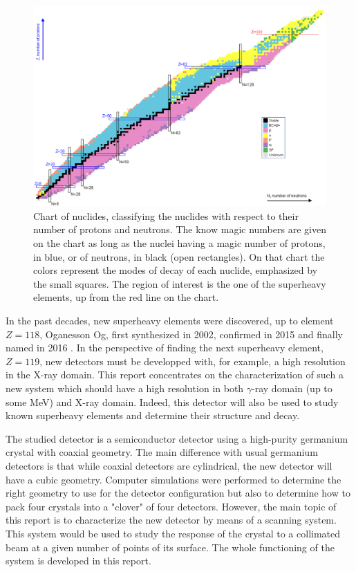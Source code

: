 \documentclass[11pt,a4paper]{article}
\begin{document}
\begin{figure}[!h]
\centering
\includegraphics[scale=0.6]{Nuclchart2.png}
\caption{Chart of nuclides, classifying the nuclides with respect to their number of protons and neutrons. The know magic numbers are given on the chart as long as the nuclei having a magic number of protons, in blue, or of neutrons, in black (open rectangles). On that chart the colors represent the modes of decay of each nuclide, emphasized by the small squares. The region of interest is the one of the superheavy elements, up from the red line on the chart.}
\label{Nuclchart}
\end{figure}

In the past decades, new superheavy elements were discovered, up to element $Z = 118$, Oganesson Og, first synthesized in 2002, confirmed in 2015 and finally named in 2016 \cite{element118}.
In the perspective of finding the next superheavy element, $Z = 119$, new detectors must be developped with, for example, a high resolution in the X-ray domain. This report concentrates on the characterization of such a new system which should have a high resolution in both $\gamma$-ray domain (up to some MeV) and X-ray domain. Indeed, this detector will also be used to study known superheavy elements and determine their structure and decay.

The studied detector is a semiconductor detector using a high-purity germanium crystal with coaxial geometry. The main difference with usual germanium detectors is that while coaxial detectors are cylindrical, the new detector will have a cubic geometry. Computer simulations were performed to determine the right geometry to use for the detector configuration but also to determine how to pack four crystals into a "clover" of four detectors. However, the main topic of this report is to characterize the new detector by means of a scanning system. This system would be used to study the response of the crystal to a collimated beam at a given number of points of its surface. The whole functioning of the system is developed in this report.
\end{document}
